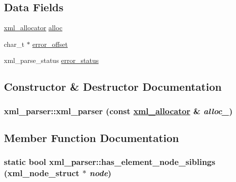 \subsection*{Data Fields}
\begin{CompactItemize}
\item 
\hyperlink{structxml__allocator}{xml\_\-allocator} \hyperlink{structxml__parser_213cf019cbf45f5049acdcae296a2976}{alloc}
\item 
char\_\-t $\ast$ \hyperlink{structxml__parser_2476a71cd7e67b3f4bdbcd1323524503}{error\_\-offset}
\item 
xml\_\-parse\_\-status \hyperlink{structxml__parser_0555859911674e5a7a349447d6533383}{error\_\-status}
\end{CompactItemize}


\subsection{Constructor \& Destructor Documentation}
\hypertarget{structxml__parser_cc030c4ed339b238e1ff2d3e6fa7188b}{
\subsubsection[xml\_\-parser]{\setlength{\rightskip}{0pt plus 5cm}xml\_\-parser::xml\_\-parser (const \hyperlink{structxml__allocator}{xml\_\-allocator} \& {\em alloc\_\-})}}
\label{structxml__parser_cc030c4ed339b238e1ff2d3e6fa7188b}




\subsection{Member Function Documentation}
\hypertarget{structxml__parser_6be4da5b3206913d0e3bd8320394df41}{
\subsubsection[has\_\-element\_\-node\_\-siblings]{\setlength{\rightskip}{0pt plus 5cm}static bool xml\_\-parser::has\_\-element\_\-node\_\-siblings (xml\_\-node\_\-struct $\ast$ {\em node})}}
\label{structxml__parser_6be4da5b3206913d0e3bd8320394df41}


